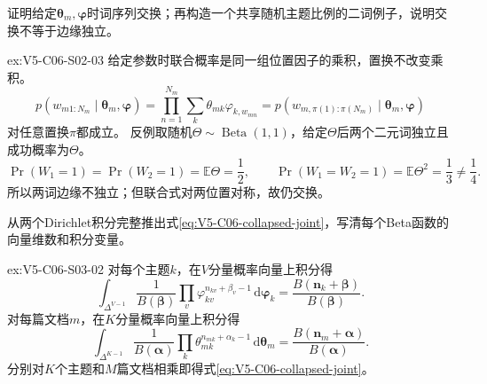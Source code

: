 \begin{SLChapterExercisePairSection}
\begin{exercise}\label{ex:V5-C06-S02-03}
证明给定$\boldsymbol\theta_m,\boldsymbol\varphi$时词序列交换；再构造一个共享随机主题比例的二词例子，说明交换不等于边缘独立。
\end{exercise}
\ifSLFullEdition
{}\label{sol:V5-C06-S02-03}
\begin{chapterexercisesolution}{ex:V5-C06-S02-03}
\nopagebreak[4]
给定参数时联合概率是同一组位置因子的乘积，置换不改变乘积。
\[
p(w_{m1:N_m}\mid\boldsymbol\theta_m,\boldsymbol\varphi)
=\prod_{n=1}^{N_m}\sum_k\theta_{mk}\varphi_{k,w_{mn}}
=p(w_{m,\pi(1):\pi(N_m)}\mid\boldsymbol\theta_m,\boldsymbol\varphi)
\]
对任意置换$\pi$都成立。
反例取随机$\Theta\sim\operatorname{Beta}(1,1)$，给定$\Theta$后两个二元词独立且成功概率为$\Theta$。
\[
\Pr(W_1=1)=\Pr(W_2=1)=\mathbb E\Theta=\frac12,\qquad
\Pr(W_1=W_2=1)=\mathbb E\Theta^2=\frac13\ne\frac14.
\]
所以两词边缘不独立；但联合式对两位置对称，故仍交换。
\end{chapterexercisesolution}
\fi

\begin{exercise}\label{ex:V5-C06-S03-02}
从两个Dirichlet积分完整推出式\eqref{eq:V5-C06-collapsed-joint}，写清每个Beta函数的向量维数和积分变量。
\end{exercise}
\ifSLFullEdition
{}\label{sol:V5-C06-S03-02}
\begin{chapterexercisesolution}{ex:V5-C06-S03-02}
\nopagebreak[4]
对每个主题$k$，在$V$分量概率向量上积分得
\[
\int_{\Delta^{V-1}}
\frac1{B(\boldsymbol\beta)}\prod_v\varphi_{kv}^{n_{kv}+\beta_v-1}
\,\mathrm d\boldsymbol\varphi_k
=\frac{B(\boldsymbol n_k+\boldsymbol\beta)}{B(\boldsymbol\beta)}.
\]
对每篇文档$m$，在$K$分量概率向量上积分得
\[
\int_{\Delta^{K-1}}
\frac1{B(\boldsymbol\alpha)}\prod_k\theta_{mk}^{n_{mk}+\alpha_k-1}
\,\mathrm d\boldsymbol\theta_m
=\frac{B(\boldsymbol n_m+\boldsymbol\alpha)}{B(\boldsymbol\alpha)}.
\]
分别对$K$个主题和$M$篇文档相乘即得式\eqref{eq:V5-C06-collapsed-joint}。
\end{chapterexercisesolution}
\fi


\end{SLChapterExercisePairSection}
